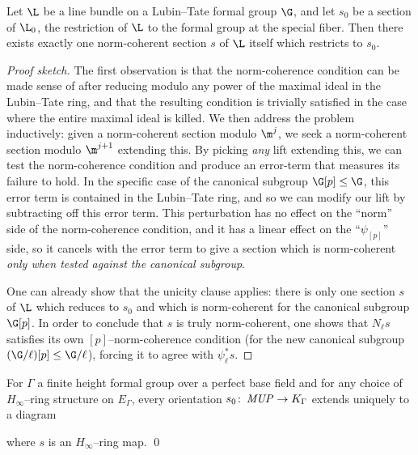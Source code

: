 \begin{theorem}\label{AndosAlgebraicTheorem}
Let \(\L\) be a line bundle on a Lubin--Tate formal group \(\G\), and let \(s_0\) be a section of \(\L_0\), the restriction of \(\L\) to the formal group at the special fiber.  Then there exists exactly one norm-coherent section \(s\) of \(\L\) itself which restricts to \(s_0\).
\end{theorem}
\begin{proof}[Proof sketch]
The first observation is that the norm-coherence condition can be made sense of after reducing modulo any power of the maximal ideal in the Lubin--Tate ring, and that the resulting condition is trivially satisfied in the case where the entire maximal ideal is killed.  We then address the problem inductively: given a norm-coherent section modulo \(\m^j\), we seek a norm-coherent section modulo \(\m^{j+1}\) extending this.  By picking \emph{any} lift extending this, we can test the norm-coherence condition and produce an error-term that measures its failure to hold.  In the specific case of the canonical subgroup \(\G[p] \le \G\), this error term is contained in the Lubin--Tate ring, and so we can modify our lift by subtracting off this error term.  This perturbation has no effect on the ``norm'' side of the norm-coherence condition, and it has a linear effect on the ``\(\psi_{[p]}\)'' side, so it cancels with the error term to give a section which is norm-coherent \emph{only when tested against the canonical subgroup}.

One can already show that the unicity clause applies: there is only one section \(s\) of \(\L\) which reduces to \(s_0\) and which is norm-coherent for the canonical subgroup \(\G[p]\).  In order to conclude that \(s\) is truly norm-coherent, one shows that \(N_\ell s\) satisfies its own \([p]\)--norm-coherence condition (for the new canonical subgroup \((\G / \ell)[p] \le \G / \ell\)), forcing it to agree with \(\psi_\ell^* s\).
\end{proof}

\begin{corollary}\label{AHSHinftyResultForEthy}
For \(\Gamma\) a finite height formal group over a perfect base field and for any choice of \(H_\infty\)--ring structure on \(E_\Gamma\), every orientation \(s_0\colon\thinspace \mathit{MUP} \to K_\Gamma\) extends uniquely to a diagram
\begin{center}
\end{center}
where \(s\) is an \(H_\infty\)--ring map. \qed
\end{corollary}

